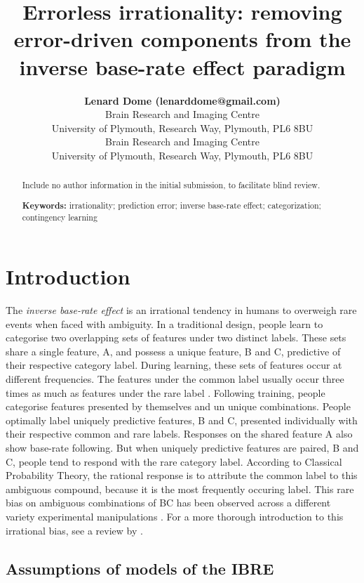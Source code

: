 \documentclass[10pt,letterpaper]{article}
\title{Errorless irrationality: removing error-driven components from the inverse base-rate effect paradigm}
\author{{\large \bf Lenard Dome (lenarddome@gmail.com)} \\
  Brain Research and Imaging Centre \\
  University of Plymouth, Research Way, Plymouth, PL6 8BU
  \AND {\large \bf Andy J. Wills (andy.wills@plymouth.ac.uk)} \\
  Brain Research and Imaging Centre \\
  University of Plymouth, Research Way, Plymouth, PL6 8BU}
\begin{document}
\maketitle

\begin{abstract}
Include no author information in the initial submission, to facilitate
blind review.

\textbf{Keywords:} 
irrationality; prediction error; inverse base-rate effect; categorization; contingency learning
\end{abstract}


\section{Introduction}

The \textit{inverse base-rate effect} \cite<IBRE, >{medin1988problem} is an irrational tendency in humans to overweigh rare events when faced with ambiguity.
In a traditional design, people learn to categorise two overlapping sets of features under two distinct labels.
These sets share a single feature, A, and possess a unique feature, B and C, predictive of their respective category label.
During learning, these sets of features occur at different frequencies.
The features under the common label usually occur three times as much as features under the rare label \cite{kruschke1996base}.
Following training, people categorise features presented by themselves and un unique combinations.
People optimally label uniquely predictive features, B and C, presented individually with their respective common and rare labels.
Responses on the shared feature A also show base-rate following.
But when uniquely predictive features are paired, B and C, people tend to respond with the rare category label.
According to Classical Probability Theory, the rational response is to attribute the common label to this ambiguous compound, because it is the most frequently occuring label.
This rare bias on ambiguous combinations of BC has been observed across a different variety experimental manipulations \cite{kalish2001inverse,don2017effects,don2017effects,inkster2022effect,wills2014attention}.
For a more thorough introduction to this irrational bias, see a review by .

\subsection*{Assumptions of models of the IBRE}
\end{document}
